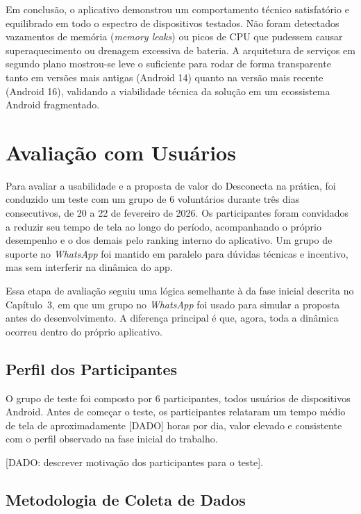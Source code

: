 Em conclusão, o aplicativo demonstrou um comportamento técnico satisfatório e equilibrado em todo o espectro de dispositivos testados. Não foram detectados vazamentos de memória (\textit{memory leaks}) ou picos de CPU que pudessem causar superaquecimento ou drenagem excessiva de bateria. A arquitetura de serviços em segundo plano mostrou-se leve o suficiente para rodar de forma transparente tanto em versões mais antigas (Android 14) quanto na versão mais recente (Android 16), validando a viabilidade técnica da solução em um ecossistema Android fragmentado.

\section{Avaliação com Usuários}

Para avaliar a usabilidade e a proposta de valor do Desconecta na prática, foi conduzido um teste com um grupo de 6 voluntários durante três dias consecutivos, de 20 a 22 de fevereiro de 2026. Os participantes foram convidados a reduzir seu tempo de tela ao longo do período, acompanhando o próprio desempenho e o dos demais pelo ranking interno do aplicativo. Um grupo de suporte no \textit{WhatsApp} foi mantido em paralelo para dúvidas técnicas e incentivo, mas sem interferir na dinâmica do app.

Essa etapa de avaliação seguiu uma lógica semelhante à da fase inicial descrita no Capítulo~3, em que um grupo no \textit{WhatsApp} foi usado para simular a proposta antes do desenvolvimento. A diferença principal é que, agora, toda a dinâmica ocorreu dentro do próprio aplicativo.

\subsection{Perfil dos Participantes}

O grupo de teste foi composto por 6 participantes, todos usuários de dispositivos Android. Antes de começar o teste, os participantes relataram um tempo médio de tela de aproximadamente [DADO] horas por dia, valor elevado e consistente com o perfil observado na fase inicial do trabalho.

[DADO: descrever motivação dos participantes para o teste].

\subsection{Metodologia de Coleta de Dados}

